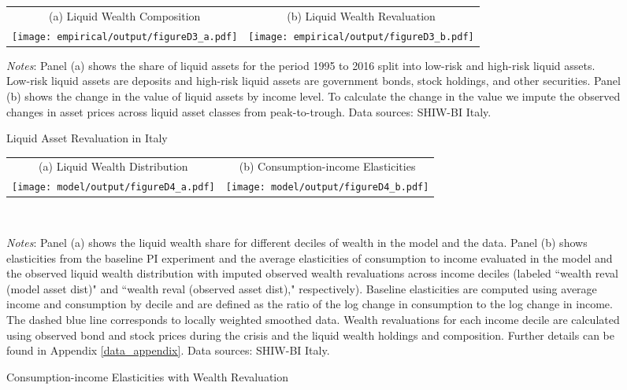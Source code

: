 \documentclass[12pt]{article}
\begin{document}
\begin{spacing}{1.5}
\begin{figure}[H]
\caption{Liquid Asset Revaluation in Italy}
\label{fig_liqw_reval}
\begin{tabular}{cc}
(a) Liquid Wealth Composition & (b) Liquid Wealth Revaluation  \\
\texttt{[image: empirical/output/figureD3\_a.pdf]} &
\texttt{[image: empirical/output/figureD3\_b.pdf]}  \\
\end{tabular}
\raggedright{}\textit{\footnotesize{}Notes}{: \footnotesize{Panel (a) shows the share of liquid assets for the period 1995 to 2016 split into low-risk and high-risk liquid assets. Low-risk liquid assets are deposits and high-risk liquid assets are government bonds, stock holdings, and other securities. Panel (b) shows the change in the value of liquid assets by income level. To calculate the change in the value we impute the observed changes in asset prices across liquid asset classes from peak-to-trough. Data sources: SHIW-BI Italy.}}{\footnotesize\par}
\end{figure}



\begin{figure}[H]
\caption{Consumption-income Elasticities with Wealth Revaluation}
\label{fig_wealthreval}
\begin{tabular}{cc}
(a) Liquid Wealth Distribution & (b) Consumption-income Elasticities  \\
\texttt{[image: model/output/figureD4\_a.pdf]} &
\texttt{[image: model/output/figureD4\_b.pdf]}  \\
\end{tabular}  \smallskip \\
\raggedright{}\textit{\footnotesize{}Notes}{: \footnotesize{{\color{black} Panel (a) shows the liquid wealth share for different deciles of wealth in the model and the data.
Panel (b) shows  elasticities from the baseline PI experiment and the average elasticities of consumption to income evaluated in the model and the observed liquid wealth distribution with imputed observed wealth revaluations across income deciles (labeled ``wealth reval (model asset dist)" and ``wealth reval (observed asset dist),"  respectively).  Baseline elasticities are computed using average income and consumption by decile and are defined as the ratio of the log change in consumption to the log change in income. The dashed blue line corresponds to locally weighted smoothed data.  Wealth revaluations for each income decile are calculated using observed bond and stock prices during the crisis and the liquid wealth holdings and composition. Further details can be found in Appendix \ref{data_appendix}.  Data sources: SHIW-BI Italy.
}
}}{\footnotesize\par}
\end{figure}



\end{spacing}
\end{document}
